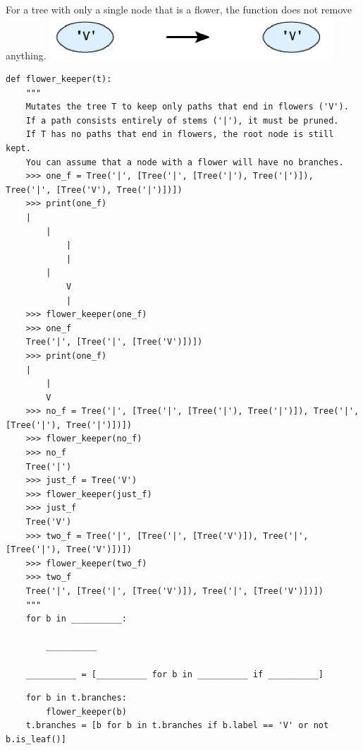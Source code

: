 For a tree with only a single node that is a flower, the function does not remove anything.
\newline
\includegraphics[width=0.8\textwidth]{blue-root.png}
\newline
\newline

\begin{lstlisting}
def flower_keeper(t):
    """
    Mutates the tree T to keep only paths that end in flowers ('V').
    If a path consists entirely of stems ('|'), it must be pruned.
    If T has no paths that end in flowers, the root node is still kept.
    You can assume that a node with a flower will have no branches.
    >>> one_f = Tree('|', [Tree('|', [Tree('|'), Tree('|')]), Tree('|', [Tree('V'), Tree('|')])])
    >>> print(one_f)
    |
        |
            |
            |
        |
            V
            |
    >>> flower_keeper(one_f)
    >>> one_f
    Tree('|', [Tree('|', [Tree('V')])])
    >>> print(one_f)
    |
        |
        V
    >>> no_f = Tree('|', [Tree('|', [Tree('|'), Tree('|')]), Tree('|', [Tree('|'), Tree('|')])])
    >>> flower_keeper(no_f)
    >>> no_f
    Tree('|')
    >>> just_f = Tree('V')
    >>> flower_keeper(just_f)
    >>> just_f
    Tree('V')
    >>> two_f = Tree('|', [Tree('|', [Tree('V')]), Tree('|', [Tree('|'), Tree('V')])])
    >>> flower_keeper(two_f)
    >>> two_f
    Tree('|', [Tree('|', [Tree('V')]), Tree('|', [Tree('V')])])
    """
    for b in __________:

        __________

    __________ = [__________ for b in __________ if __________]
\end{lstlisting}
\begin{solution}[0.5in]
\begin{lstlisting}
    for b in t.branches:
        flower_keeper(b)
    t.branches = [b for b in t.branches if b.label == 'V' or not b.is_leaf()]
\end{lstlisting}
\end{solution}
